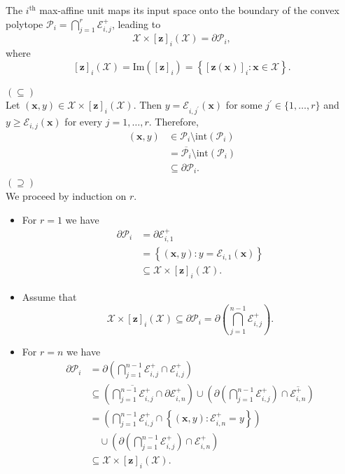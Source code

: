 \begin{proposition}\label{prop:image_mas_input_space}
    The $i^\text{th}$ max-affine unit maps its input space onto the boundary of the convex polytope $\mathcal{P}_i=\bigcap_{j=1}^{r}\mathcal{E}_{i,j}^+$, leading to $$\mathcal{X}\times[\mathbf{z}]_i(\mathcal{X})=\partial\mathcal{P}_i,$$where $$[\mathbf{z}]_i(\mathcal{X})=\mathrm{Im}\left([\mathbf{z}]_i\right)=\left\{[\mathbf{z}(\mathbf{x})]_i:\mathbf{x}\in\mathcal{X}\right\}.$$
\end{proposition}

\begin{tproof}
    $(\subseteq)$\\Let $(\mathbf{x},y)\in\mathcal{X}\times[\mathbf{z}]_i(\mathcal{X})$. Then $y=\mathcal{E}_{i,j^\prime}(\mathbf{x})$ for some $j^\prime\in\{1,\dots,r\}$ and $y\geq\mathcal{E}_{i,j}(\mathbf{x})$ for every $j=1,\dots,r$. Therefore,
    \begin{align*}
        (\mathbf{x},y)&\in\mathcal{P}_i\setminus\mathrm{int}\left(\mathcal{P}_i\right)\\&=\overline{\mathcal{P}_i}\setminus\mathrm{int}\left(\mathcal{P}_i\right)\\&\subseteq\partial\mathcal{P}_i.
    \end{align*}
    $(\supseteq)$\\We proceed by induction on $r$. 
    \begin{itemize}
        \item For $r=1$ we have
        \begin{align*}
            \partial\mathcal{P}_i&=\partial\mathcal{E}_{i,1}^+\\&=\left\{(\mathbf{x},y):y=\mathcal{E}_{i,1}(\mathbf{x})\right\}\\&\subseteq\mathcal{X}\times[\mathbf{z}]_i(\mathcal{X}).
        \end{align*}
        \item Assume that $$\mathcal{X}\times[\mathbf{z}]_i(\mathcal{X})\subseteq\partial\mathcal{P}_i=\partial\left(\bigcap_{j=1}^{n-1}\mathcal{E}_{i,j}^+\right).$$
        \item For $r=n$ we have
        \begin{align*}
            \partial\mathcal{P}_i&=\partial\left(\bigcap_{j=1}^{n-1}\mathcal{E}_{i,j}^+\cap\mathcal{E}_{i,j}^+\right)\\&\subseteq\left(\overline{\bigcap_{j=1}^{n-1}\mathcal{E}_{i,j}^+}\cap\partial\mathcal{E}_{i,n}^+\right)\cup\left(\partial\left(\bigcap_{j=1}^{n-1}\mathcal{E}_{i,j}^+\right)\cap\overline{\mathcal{E}_{i,n}^+}\right)\\&=\left(\bigcap_{j=1}^{n-1}\mathcal{E}_{i,j}^+\cap\left\{(\mathbf{x},y):\mathcal{E}^+_{i,n}=y\right\}\right)\\&\quad\cup\left(\partial\left(\bigcap_{j=1}^{n-1}\mathcal{E}_{i,j}^+\right)\cap\mathcal{E}_{i,n}^+\right)\\&\subseteq\mathcal{X}\times[\mathbf{z}]_i(\mathcal{X}).
        \end{align*}
    \end{itemize}
\end{tproof}

